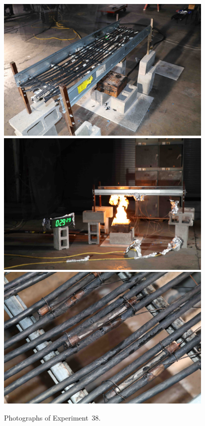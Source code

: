 \documentclass[12pt]{article}
\begin{document}
\begin{figure}[p]
\centering
\includegraphics[height=2.75in]{../FIGURES/Test_38_setup} \\
\includegraphics[height=2.75in]{../FIGURES/Test_38_29_min_29_s} \\
\includegraphics[height=2.75in]{../FIGURES/Test_38_damage}
\caption[Photographs of Experiment~38]{Photographs of Experiment~38.}
\label{fig:Test_38_photos}
\end{figure}


\clearpage
\end{document}
